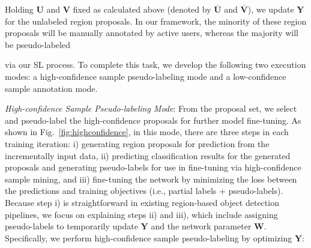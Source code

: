 \documentclass[journal]{IEEEtran}
\begin{document}
Holding $\mathbf{U}$ and $\mathbf{V}$ fixed as calculated above (denoted by $\mathbf{\overline{U}}$ and $\mathbf{\overline{V}}$), we update $\mathbf{Y}$ for the unlabeled region proposals. In our framework, the minority of these region proposals will be manually annotated by active users, {whereas} the majority will be pseudo-labeled {via our SL process. To complete this task, we develop the following two execution modes: a high-confidence sample pseudo-labeling {mode} and a low-confidence sample annotation mode. 

\textit{High-confidence Sample Pseudo-labeling Mode}: From the proposal set, we select and pseudo-label the high-confidence proposals for further model fine-tuning. As shown in Fig.~\ref{fig:highconfidence}, {in this mode}, {there are three steps in} each training iteration: i) generating region proposals for prediction from the incrementally input data, ii) predicting {classification results} for the generated proposals and {generating pseudo-labels} for use in fine-tuning via high-confidence sample mining, and iii) fine-tuning the network by minimizing the loss between the predictions and training objectives (i.e., partial labels + {pseudo-labels}). Because step i) is straightforward in existing region-based object detection pipelines, we focus on explaining steps ii) and iii), which include assigning pseudo-labels to temporarily update $\mathbf{Y}$ and the network parameter $\mathbf{W}$. Specifically, we perform high-confidence sample pseudo-labeling by optimizing $\mathbf{Y}$:

}
\end{document}
